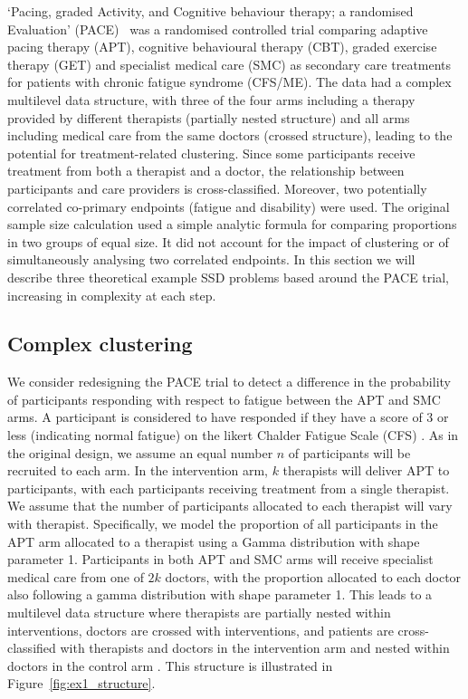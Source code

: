 \documentclass[sagev]{sagej}
\begin{document}
`Pacing, graded Activity, and Cognitive behaviour therapy; a randomised Evaluation' (PACE)~\cite{White2007, White2011} was a randomised controlled trial comparing adaptive pacing therapy (APT), cognitive behavioural therapy (CBT), graded exercise therapy (GET) and specialist medical care (SMC) as secondary care treatments for patients with chronic fatigue syndrome (CFS/ME). The data had a complex multilevel data structure, with three of the four arms including a therapy provided by different therapists (partially nested structure) and all arms including medical care from the same doctors (crossed structure), leading to the potential for treatment-related clustering. Since some participants receive treatment from both a therapist and a doctor, the relationship between participants and care providers is cross-classified. Moreover, two potentially correlated co-primary endpoints (fatigue and disability) were used. The original sample size calculation used a simple analytic formula for comparing proportions in two groups of equal size. It did not account for the impact of clustering or of simultaneously analysing two correlated endpoints. In this section we will describe three theoretical example SSD problems based around the PACE trial, increasing in complexity at each step. 

\subsection{Complex clustering}\label{sec:ex1}

We consider redesigning the PACE trial to detect a difference in the probability of participants responding with respect to fatigue between the APT and SMC arms. A participant is considered to have responded if they have a score of 3 or less (indicating normal fatigue) on the likert Chalder Fatigue Scale (CFS) \cite{Chalder1993}. As in the original design, we assume an equal number $n$ of participants will be recruited to each arm. In the intervention arm, $k$ therapists will deliver APT to participants, with each participants receiving treatment from a single therapist. We assume that the number of participants allocated to each therapist will vary with therapist. Specifically, we model the proportion of all participants in the APT arm allocated to a therapist using a Gamma distribution with shape parameter 1. Participants in both APT and SMC arms will receive specialist medical care from one of $2k$ doctors, with the proportion allocated to each doctor also following a gamma distribution with shape parameter 1. This leads to a multilevel data structure where therapists are partially nested within interventions, doctors are crossed with interventions, and patients are cross-classified with therapists and doctors in the intervention arm and nested within doctors in the control arm \cite{Walwyn2010}. This structure is illustrated in Figure~\ref{fig:ex1_structure}.
\end{document}
